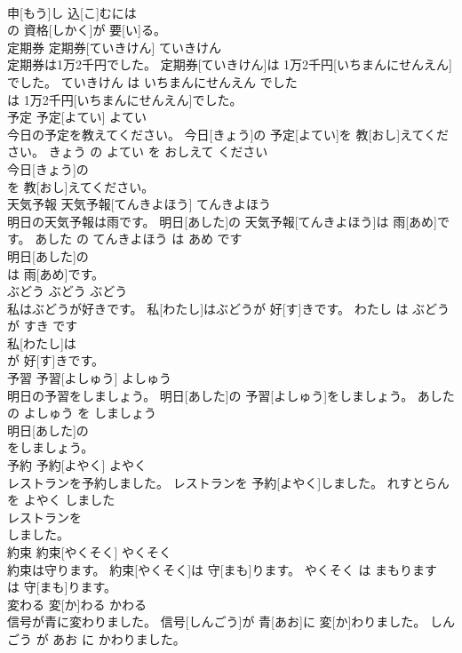 \documentclass[8pt]{extreport}
\begin{document}
\begin{CJK}{UTF8}{min}
\\	申[もう]し 込[こ]むには
\\	の 資格[しかく]が 要[い]る。			
\\	定期券	定期券[ていきけん]	ていきけん	
\\	定期券は1万2千円でした。	定期券[ていきけん]は 1万2千円[いちまんにせんえん]でした。	ていきけん は いちまんにせんえん でした	
\\	は 1万2千円[いちまんにせんえん]でした。			
\\	予定	予定[よてい]	よてい	
\\	今日の予定を教えてください。	今日[きょう]の 予定[よてい]を 教[おし]えてください。	きょう の よてい を おしえて ください	
\\	今日[きょう]の
\\	を 教[おし]えてください。			
\\	天気予報	天気予報[てんきよほう]	てんきよほう	
\\	明日の天気予報は雨です。	明日[あした]の 天気予報[てんきよほう]は 雨[あめ]です。	あした の てんきよほう は あめ です	
\\	明日[あした]の
\\	は 雨[あめ]です。			
\\	ぶどう	ぶどう	ぶどう	
\\	私はぶどうが好きです。	私[わたし]はぶどうが 好[す]きです。	わたし は ぶどう が すき です	
\\	私[わたし]は
\\	が 好[す]きです。			
\\	予習	予習[よしゅう]	よしゅう	
\\	明日の予習をしましょう。	明日[あした]の 予習[よしゅう]をしましょう。	あした の よしゅう を しましょう	
\\	明日[あした]の
\\	をしましょう。			
\\	予約	予約[よやく]	よやく	
\\	レストランを予約しました。	レストランを 予約[よやく]しました。	れすとらん を よやく しました	
\\	レストランを
\\	しました。			
\\	約束	約束[やくそく]	やくそく	
\\	約束は守ります。	約束[やくそく]は 守[まも]ります。	やくそく は まもります	
\\	は 守[まも]ります。			
\\	変わる	変[か]わる	かわる	
\\	信号が青に変わりました。	信号[しんごう]が 青[あお]に 変[か]わりました。	しんごう が あお に かわりました。	

\end{CJK}
\end{document}
